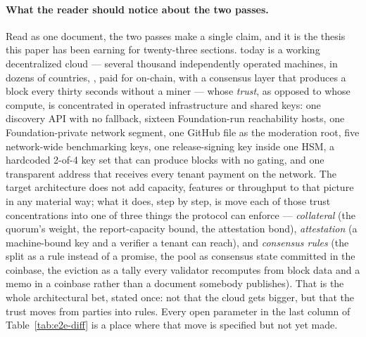 \paragraph{What the reader should notice about the two passes.}
Read as one document, the two passes make a single claim, and it is the thesis this paper has been
earning for twenty-three sections. \Flux today is a working decentralized cloud --- several thousand
independently operated machines, in dozens of countries, , paid
for on-chain, with a consensus layer that produces a block every thirty seconds without a miner ---
whose \emph{trust}, as opposed to whose compute, is concentrated in operated infrastructure and
shared keys: one discovery API with no fallback, sixteen Foundation-run reachability hosts, one
Foundation-private network segment, one GitHub file as the moderation root, five network-wide
benchmarking keys, one release-signing key inside one HSM, a hardcoded 2-of-4 key set that can
produce blocks with no gating, and one transparent address that receives every tenant payment on the
network. The target architecture does not add capacity, features or throughput to that picture in any
material way; what it does, step by step, is move each of those trust concentrations into one of
three things the protocol can enforce --- \emph{collateral} (the quorum's weight, the report-capacity
bound, the attestation bond), \emph{attestation} (a machine-bound key and a verifier a tenant can
reach), and \emph{consensus rules} (the split as a rule instead of a promise, the pool as consensus
state committed in the coinbase, the eviction as a tally every validator recomputes from block data
and a memo in a coinbase rather than a document somebody publishes). That is the whole architectural
bet, stated once: not that the cloud gets bigger, but that the trust moves from parties into rules.
Every open parameter in the last column of Table~\ref{tab:e2e-diff} is a place where that move is
specified but not yet made.


